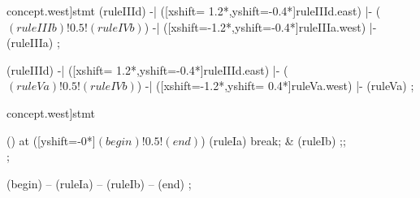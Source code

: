 \begin{syntax}[[xshift=20mm]concept.west]{stmt}
  \draw[path] (ruleIIId)
           -| ([xshift= 1.2*\syntaxruledist,yshift=-0.4*\syntaxruledist]ruleIIId.east)
           |- ($(ruleIIIb)!0.5!(ruleIVb)$)
           -| ([xshift=-1.2*\syntaxruledist,yshift=-0.4*\syntaxruledist]ruleIIIa.west)
           |- (ruleIIIa)
  ;
  
  \draw[path] (ruleIIId)
           -| ([xshift= 1.2*\syntaxruledist,yshift=-0.4*\syntaxruledist]ruleIIId.east)
           |- ($(ruleVa)!0.5!(ruleIVb)$)
           -| ([xshift=-1.2*\syntaxruledist,yshift= 0.4*\syntaxruledist]ruleVa.west)
           |- (ruleVa)
  ;
\end{syntax}

\begin{syntax}[[xshift=20mm]concept.west]{stmt}
  
  \node[sequence,column sep=1.2cm] () at ([yshift=-0*\syntaxruledist]$(begin)!0.5!(end)$) {
    \node[terminal]    (ruleIa) {break};
    &
    \node[terminal]    (ruleIb) {;};
    \\
  };
  
  \draw[path] (begin)
           -- (ruleIa)
           -- (ruleIb)
           -- (end)
  ;
\end{syntax}

